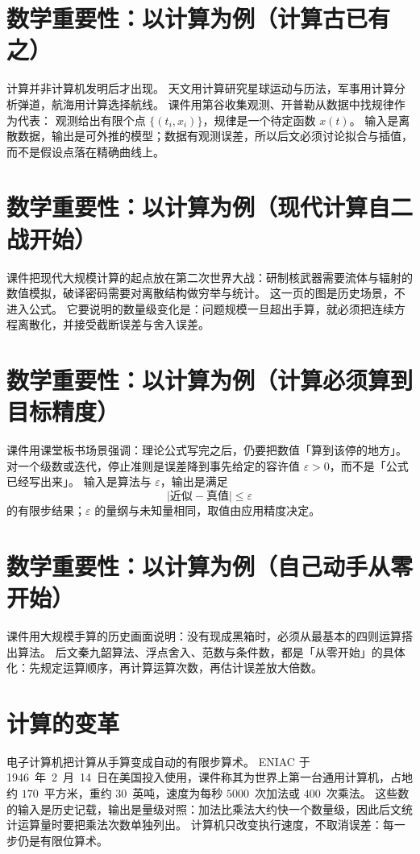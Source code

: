 \section{数学重要性：以计算为例（计算古已有之）}

计算并非计算机发明后才出现。
天文用计算研究星球运动与历法，军事用计算分析弹道，航海用计算选择航线。
课件用第谷收集观测、开普勒从数据中找规律作为代表：
观测给出有限个点 $\{(t_i,x_i)\}$，规律是一个待定函数 $x(t)$。
输入是离散数据，输出是可外推的模型；数据有观测误差，所以后文必须讨论拟合与插值，而不是假设点落在精确曲线上。

\section{数学重要性：以计算为例（现代计算自二战开始）}

课件把现代大规模计算的起点放在第二次世界大战：研制核武器需要流体与辐射的数值模拟，破译密码需要对离散结构做穷举与统计。
这一页的图是历史场景，不进入公式。
它要说明的数量级变化是：问题规模一旦超出手算，就必须把连续方程离散化，并接受截断误差与舍入误差。

\section{数学重要性：以计算为例（计算必须算到目标精度）}

课件用课堂板书场景强调：理论公式写完之后，仍要把数值「算到该停的地方」。
对一个级数或迭代，停止准则是误差降到事先给定的容许值 $\varepsilon>0$，而不是「公式已经写出来」。
输入是算法与 $\varepsilon$，输出是满足
\[
\lvert\text{近似}-\text{真值}\rvert\le\varepsilon
\]
的有限步结果；$\varepsilon$ 的量纲与未知量相同，取值由应用精度决定。

\section{数学重要性：以计算为例（自己动手从零开始）}

课件用大规模手算的历史画面说明：没有现成黑箱时，必须从最基本的四则运算搭出算法。
后文秦九韶算法、浮点舍入、范数与条件数，都是「从零开始」的具体化：先规定运算顺序，再计算运算次数，再估计误差放大倍数。

\section{计算的变革}

电子计算机把计算从手算变成自动的有限步算术。
ENIAC 于 1946~年~2~月~14~日在美国投入使用，课件称其为世界上第一台通用计算机，占地约 $170$~平方米，重约 $30$~英吨，速度为每秒 $5000$~次加法或 $400$~次乘法。
这些数的输入是历史记载，输出是量级对照：加法比乘法大约快一个数量级，因此后文统计运算量时要把乘法次数单独列出。
计算机只改变执行速度，不取消误差：每一步仍是有限位算术。

